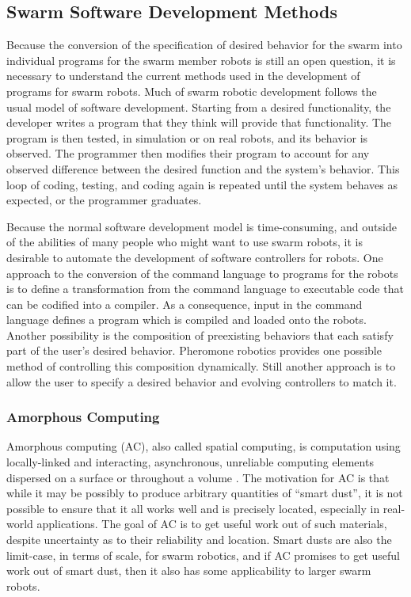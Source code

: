 \documentclass[]{article}
\begin{document}
\subsection{Swarm Software Development Methods}

Because the conversion of the specification of desired behavior for the swarm into individual programs for the swarm member robots is still an open question, it is necessary to understand the current methods used in the development of programs for swarm robots. 
Much of swarm robotic development follows the usual model of software development. 
Starting from a desired functionality, the developer writes a program that they think will provide that functionality.
The program is then tested, in simulation or on real robots, and its behavior is observed. 
The programmer then modifies their program to account for any observed difference between the desired function and the system's behavior. 
This loop of coding, testing, and coding again is repeated until the system behaves as expected, or the programmer graduates. 

Because the normal software development model is time-consuming, and outside of the abilities of many people who might want to use swarm robots, it is desirable to automate the development of software controllers for robots. 
One approach to the conversion of the command language to programs for the robots is to define a transformation from the command language to executable code that can be codified into a compiler. 
As a consequence, input in the command language defines a program which is compiled and loaded onto the robots. 
Another possibility is the composition of preexisting behaviors that each satisfy part of the user's desired behavior. 
Pheromone robotics provides one possible method of controlling this composition dynamically. 
Still another approach is to allow the user to specify a desired behavior and evolving controllers to match it. 

\subsubsection{Amorphous Computing}

Amorphous computing (AC), also called spatial computing, is computation using locally-linked and interacting, asynchronous, unreliable computing elements dispersed on a surface or throughout a volume \cite{abelson2000amorphous}. 
The motivation for AC is that while it may be possibly to produce arbitrary quantities of ``smart dust'', it is not possible to ensure that it all works well and is precisely located, especially in real-world applications.
The goal of AC is to get useful work out of such materials, despite uncertainty as to their reliability and location. 
Smart dusts are also the limit-case, in terms of scale, for swarm robotics, and if AC promises to get useful work out of smart dust, then it also has some applicability to larger swarm robots.
\end{document}
